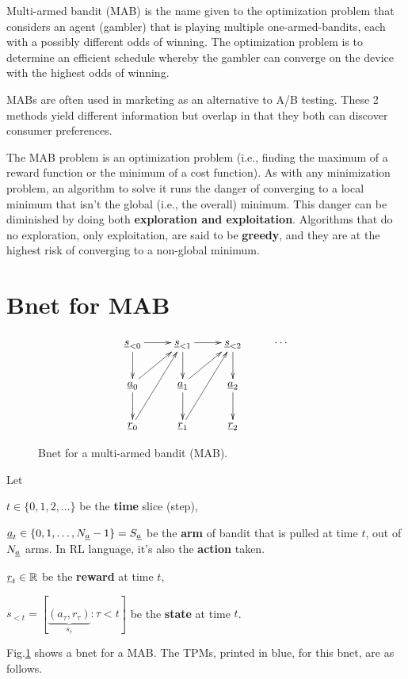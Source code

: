 Multi-armed bandit (MAB)
is the name given to the 
optimization problem that considers an agent (gambler)
that
is playing multiple one-armed-bandits,
each with a possibly
different odds of winning.
The optimization problem is to determine
an efficient schedule
whereby the gambler can converge 
on the device with the highest odds of winning.




MABs are often used in marketing 
as an alternative to A/B testing.
These 2 methods yield different 
information but
overlap in that they 
both can discover consumer preferences.

The MAB problem is
an optimization problem (i.e., 
finding the maximum of 
a reward  function
or the minimum of a cost function).
As with any minimization problem,
an algorithm to solve it
runs the danger of
converging
to a local minimum
that isn't the global (i.e., 
the overall) minimum.
This danger can be diminished 
by doing both {\bf exploration
and exploitation}.
Algorithms that do no exploration,
only exploitation,
are said to be {\bf greedy},
and they are at the highest 
risk of converging to a non-global minimum.


\section{Bnet for MAB}
\begin{figure}[h!]
\centering
$$\xymatrix{
\rvs_{<0}\ar[r]\ar[d]&
\rvs_{<1}\ar[r]\ar[d]&
\rvs_{<2}\ar[d]&\cdots\\
\rva_0\ar[ur]\ar[d]&
\rva_1\ar[ur]\ar[d]&
\rva_2\ar[d]
\\
\rvr_0\ar[uur]&
\rvr_1\ar[uur]&
\rvr_2
}$$
\caption{Bnet for a multi-armed bandit (MAB).}
\label{fig-mab-bnet}
\end{figure}

Let 

$t\in \{0,1, 2, \ldots\}$ be the {\bf time}
 slice (step),

$\rva_t\in \{0, 1, \ldots, N_\rva-1\}=S_\rva$ 
 be the {\bf arm} of bandit
that is pulled at time $t$, out of $N_\rva$ arms.
In RL language, it's also the {\bf action} taken.

$\rvr_t\in \RR$ be the {\bf reward} at time $t$,


$s_{<t} = [\underbrace{
(a_\tau, r_\tau)}_{s_\tau}: \tau<t]$
be the {\bf state} at time $t$.

Fig.\ref{fig-mab-bnet}
shows a bnet 
for a MAB.
The TPMs, printed in blue,
for this bnet, are as follows.



